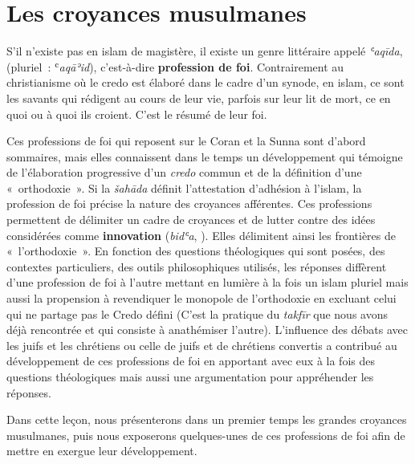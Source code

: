 

\chapter{Les croyances musulmanes}


S'il n'existe pas en islam de magistère, il existe un genre littéraire
appelé \emph{ʿaqīda}, \textbf{} (pluriel~: ʿ\emph{aqāʾid}),
c'est-à-dire \textbf{profession de foi}. Contrairement au christianisme
où le credo est élaboré dans le cadre d'un synode, en islam, ce sont les
savants qui rédigent au cours de leur vie, parfois sur leur lit de mort,
ce en quoi ou à quoi ils croient. C'est le résumé de leur foi.

Ces professions de foi qui reposent sur le Coran et la Sunna sont
d'abord sommaires, mais elles connaissent dans le temps un développement
qui témoigne de l'élaboration progressive d'un \emph{credo} commun et de
la définition d'une «~orthodoxie~». Si la \emph{šahāda} définit
l'attestation d'adhésion à l'islam, la profession de foi précise la
nature des croyances afférentes. Ces professions permettent de délimiter
un cadre de croyances et de lutter contre des idées considérées comme
\textbf{innovation} (\emph{bidʿa}, ). Elles délimitent ainsi
les frontières de «~l'orthodoxie~». En fonction des questions
théologiques qui sont posées, des contextes particuliers, des outils
philosophiques utilisés, les réponses diffèrent d'une profession de foi
à l'autre mettant en lumière à la fois un islam pluriel mais aussi la
propension à revendiquer le monopole de l'orthodoxie en excluant celui
qui ne partage pas le Credo défini (C'est la pratique du \emph{takfīr}
que nous avons déjà rencontrée et qui consiste à anathémiser l'autre).
L'influence des débats avec les juifs et les chrétiens ou celle de juifs
et de chrétiens convertis a contribué au développement de ces
professions de foi en apportant avec eux à la fois des questions
théologiques mais aussi une argumentation pour appréhender les réponses.

Dans cette leçon, nous présenterons dans un premier temps les grandes
croyances musulmanes, puis nous exposerons quelques-unes de ces
professions de foi afin de mettre en exergue leur développement.

